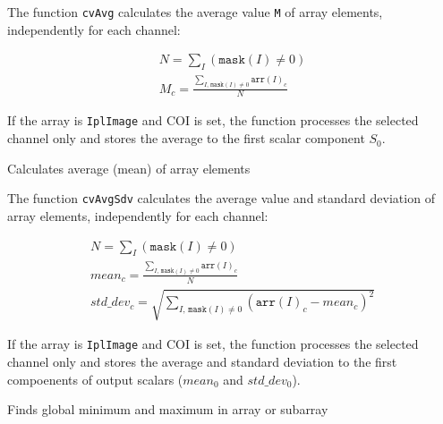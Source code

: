 The function \texttt{cvAvg} calculates the average value \texttt{M} of array elements, independently for each channel:

\[
\begin{array}{l}
N = \sum_I (\texttt{mask}(I) \ne 0)\\
M_c = \frac{\sum_{ I, \, \texttt{mask}(I) \ne 0} \texttt{arr}(I)_c}{N}
\end{array}
\]

If the array is \texttt{IplImage} and COI is set, the function processes the selected channel only and stores the average to the first scalar component $S_0$.

\label{AvgSdv}

Calculates average (mean) of array elements


\begin{description}
\end{description}

The function \texttt{cvAvgSdv} calculates the average value and standard deviation of array elements, independently for each channel:

\[
\begin{array}{l}
N = \sum_I (\texttt{mask}(I) \ne 0)\\
mean_c = \frac{\sum_{ I, \, \texttt{mask}(I) \ne 0} \texttt{arr}(I)_c}{N}\\
std\_dev_c = \sqrt{\sum_{ I, \, \texttt{mask}(I) \ne 0} (\texttt{arr}(I)_c - mean_c)^2}
\end{array}
\]

If the array is \texttt{IplImage} and COI is set, the function processes the selected channel only and stores the average and standard deviation to the first compoenents of output scalars ($mean_0$ and $std\_dev_0$).

\label{MinMaxLoc}

Finds global minimum and maximum in array or subarray


